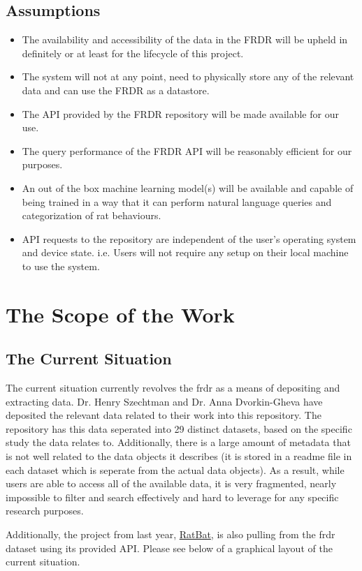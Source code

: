 \documentclass[12pt]{article}
\begin{document}
\subsection{Assumptions}

\begin{itemize}
    \item The availability and accessibility of the data in the FRDR will be upheld in definitely or at least for the lifecycle of this project.
    \item The system will not at any point, need to physically store any of the relevant data and can use the FRDR as a datastore.
    \item The API provided by the FRDR repository will be made available for our use.
    \item The query performance of the FRDR API will be reasonably efficient for our purposes.
    \item An out of the box machine learning model(s) will be available and capable of being trained in a way that it can
    perform natural language queries and categorization of rat behaviours. 
    \item API requests to the repository are independent of the user's operating system and device state. i.e. Users
    will not require any setup on their local machine to use the system.

\end{itemize}


\section{The Scope of the Work}
\subsection{The Current Situation}

\par{ The current situation currently revolves the \gls{frdr} as a means
of depositing and extracting data. Dr. Henry Szechtman and Dr. Anna Dvorkin-Gheva have
deposited the relevant data related to their work into this repository. The repository
has this data seperated into 29 distinct datasets, based on the specific study the data relates to.
Additionally, there is a large amount of metadata that is not well related to the data objects it describes
(it is stored in a readme file in each dataset which is seperate from the actual data objects). As a result, while
users are able to access all of the available data, it is very fragmented, nearly impossible to filter and search
effectively and hard to leverage for any specific research purposes. \newline\newline

Additionally, the project from last year, \href{https://ratbat.mcmaster.ca}{RatBat}, is also pulling from the \gls{frdr}
dataset using its provided API. Please see below of a graphical layout of the current situation.}
\end{document}
